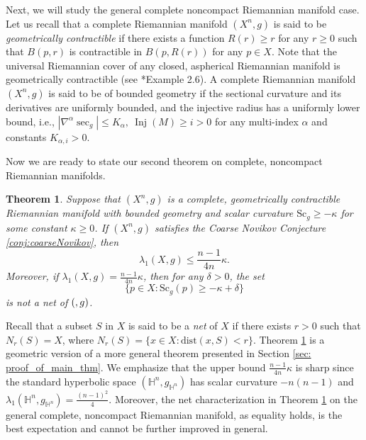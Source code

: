 \documentclass[12pt, reqno]{amsart}
\theoremstyle{plain}%
\newtheorem{theorem}{Theorem}[section]
\theoremstyle{definition}
\theoremstyle{remark}
\numberwithin{equation}{section}
\newcommand{\Sc}{\mathrm{Sc}}
\newcommand{\dist}{\mathrm{dist}}
\DeclareMathOperator{\inj}{Inj}
\begin{document}
\vspace{2mm}

Next, we will study the general complete noncompact Riemannian manifold case. Let us recall that a complete Riemannian manifold $(X^n, g)$ is said to be \emph{geometrically contractible} if there exists a function $R(r) \geq r$ for any $r \geq 0$ such that $B(p,r)$ is contractible in $B(p, R(r))$ for any $p \in X$. Note that the universal Riemannian cover of any closed, aspherical Riemannian manifold is geometrically contractible (see \cite{wang2024fillingradiusquantitativektheory}*{Example 2.6}). A complete Riemannian manifold $(X^n, g)$ is said to be of bounded geometry if the sectional curvature and its derivatives are uniformly bounded, and the injective radius has a uniformly lower bound, i.e., $|\nabla^\alpha\sec_g| \leq K_\alpha, \ 
\inj(M) \geq i > 0$ for any multi-index $\alpha$ and constants $K_{\alpha ,i}>0$.


Now we are ready to state our second theorem on complete, noncompact Riemannian manifolds.

\begin{theorem} \label{thm: geometrically_contracbile_spectrum}
Suppose that $(X^n,g)$ is a complete, geometrically contractible Riemannian manifold with bounded geometry and scalar curvature $\Sc_g \geq -\kappa$ for some constant $\kappa\geq 0$. If $(X^n,g)$ satisfies the Coarse Novikov Conjecture \ref{conj:coarseNovikov}, then
	\begin{equation}
		\lambda_1(X,g) \leq \frac{n-1}{4n}\kappa.
	\end{equation}
	Moreover, if $\lambda_1(X,g) = \frac{n-1}{4n}\kappa$, then for any $\delta>0$, the set $$\{p \in X:\Sc_g(p)\geq -\kappa+\delta\}$$ is not a net of $(\title{X},g)$.
\end{theorem}

Recall that  a subset $S$ in $X$ is  said to be  a \emph{net} of $X$ if there exists $r>0$ such that $N_r(S)=X$, where $N_r(S) = \{x \in X: \dist(x, S) < r\}$. Theorem \ref{thm: geometrically_contracbile_spectrum} is a geometric version of a more general theorem presented in Section \ref{sec: proof_of_main_thm}. We emphasize that the upper bound $\frac{n-1}{4n}\kappa$ is sharp since the standard hyperbolic space $(\mathbb H^n,g_{\mathbb H^n})$ has scalar curvature $-n(n-1)$ and $\lambda_1(\mathbb H^n,g_{\mathbb H^n})=\frac{(n-1)^2}{4}$. Moreover, the net characterization in Theorem \ref{thm: geometrically_contracbile_spectrum} on the general complete, noncompact Riemannian manifold, as equality holds, is the best expectation and cannot be further improved in general.
\end{document}
